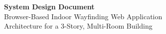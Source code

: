 



\begin{center}
  {\LARGE\bfseries System Design Document}\\[0.5em]
  {\Large Browser-Based Indoor Wayfinding Web Application}\\[1em]
  {\large Architecture for a 3-Story, Multi-Room Building}\\[2em]
\end{center}

\tableofcontents
\newpage


\newpage

\newpage

\newpage

\newpage


\newpage




